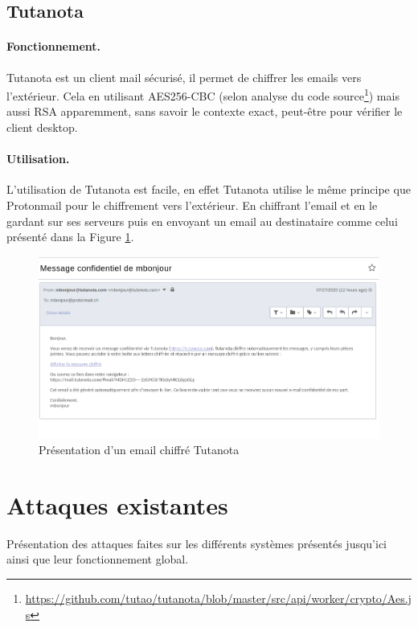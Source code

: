 \subsection{Tutanota}
\paragraph*{Fonctionnement.}
Tutanota est un client mail sécurisé, il permet de chiffrer les emails vers l'extérieur. Cela en utilisant AES256-CBC (selon analyse du code source\footnote{\url{https://github.com/tutao/tutanota/blob/master/src/api/worker/crypto/Aes.js}}) mais aussi RSA apparemment, sans savoir le contexte exact, peut-être pour vérifier le client desktop.
\paragraph*{Utilisation.}
L'utilisation de Tutanota est facile, en effet Tutanota utilise le même principe que Protonmail pour le chiffrement vers l'extérieur. En chiffrant l'email et en le gardant sur ses serveurs puis en envoyant un email au destinataire comme celui présenté dans la Figure \ref{fig:TutanotaPres}.

\begin{figure}[h!]
	\includegraphics[width=14cm]{images/tutanotaPresentation.png}
	\centering
	\caption{Présentation d'un email chiffré Tutanota}
	\label{fig:TutanotaPres}
\end{figure}

\section{Attaques existantes}
Présentation des attaques faites sur les différents systèmes présentés jusqu'ici ainsi que leur fonctionnement global.
